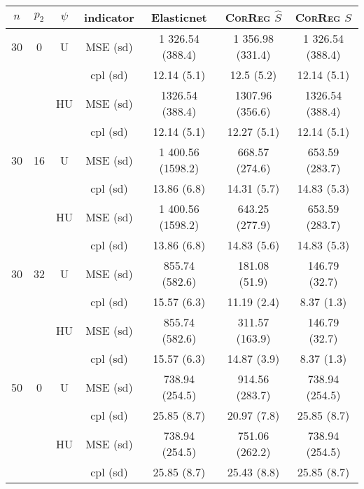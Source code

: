 \documentclass[11pt,a4paper]{article}
\begin{document}
\begin{table}[h!]
\centering
\begin{tabular}{|c|c|c|c|c|c|c|}
\hline 
$n$ & $p_2$&  $\psi$ &indicator &Elasticnet  &    \textsc{CorReg} $\hat S$& \textsc{CorReg} $S$\\ 
\hline %
30 & 0 & U&MSE (sd) & 1 326.54 (388.4) & 1 356.98 (331.4) & 1 326.54 (388.4) \\
& & & cpl (sd) & 12.14 (5.1) & 12.5 (5.2) & 12.14 (5.1) \\
 &  &HU & MSE (sd) & 1326.54 (388.4) & 1307.96 (356.6) & 1326.54 (388.4) \\
& & & cpl (sd) & 12.14 (5.1) & 12.27 (5.1) & 12.14 (5.1) \\
\hline %
30 & 16 & U&MSE (sd) & 1 400.56 (1598.2) & 668.57 (274.6) & 653.59 (283.7) \\
& & & cpl (sd) & 13.86 (6.8) & 14.31 (5.7) & 14.83 (5.3) \\
 &  &HU &MSE (sd) & 1 400.56 (1598.2) & 643.25 (277.9) & 653.59 (283.7) \\
& & & cpl (sd) & 13.86 (6.8) & 14.83 (5.6) & 14.83 (5.3) \\
\hline %
30 & 32 & U & MSE (sd) & 855.74 (582.6) & 181.08 (51.9) & 146.79 (32.7) \\
& & & cpl (sd) & 15.57 (6.3) & 11.19 (2.4) & 8.37 (1.3) \\
 &  & HU & MSE (sd) & 855.74 (582.6) & 311.57 (163.9) & 146.79 (32.7) \\
& & & cpl (sd) & 15.57 (6.3) & 14.87 (3.9) & 8.37 (1.3) \\
\hline
\hline %
50 & 0 & U&MSE (sd) & 738.94 (254.5) & 914.56 (283.7) & 738.94 (254.5) \\
& & & cpl (sd) & 25.85 (8.7) & 20.97 (7.8) & 25.85 (8.7) \\
 &  & HU &MSE (sd) & 738.94 (254.5) & 751.06 (262.2) & 738.94 (254.5) \\
& & & cpl (sd) & 25.85 (8.7) & 25.43 (8.8) & 25.85 (8.7) \\

\end{tabular}
\end{table}
\end{document}
